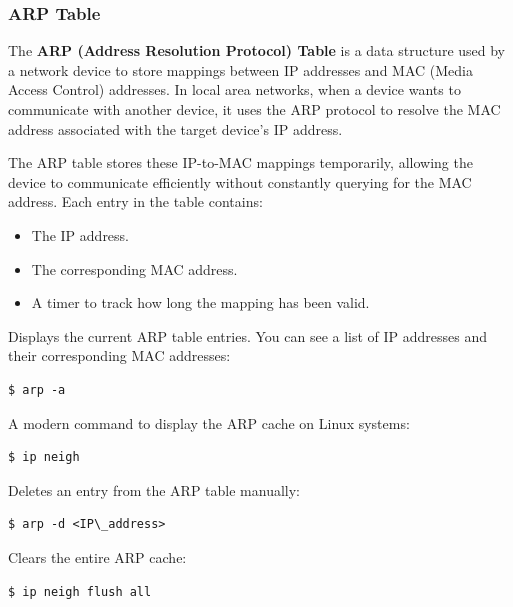 \documentclass{article}
\newenvironment{codetemplate}[1][]{%
  \mybasecolorbox[#1]
  \itshape
}{%
  \endmybasecolorbox
}
\begin{document}
\subsubsection{ARP Table}

The \textbf{ARP (Address Resolution Protocol) Table} is a data structure used by a network device to store mappings between IP addresses and MAC (Media Access Control) addresses. In local area networks, when a device wants to communicate with another device, it uses the ARP protocol to resolve the MAC address associated with the target device's IP address.

The ARP table stores these IP-to-MAC mappings temporarily, allowing the device to communicate efficiently without constantly querying for the MAC address. Each entry in the table contains:
\begin{itemize}
    \item The IP address.
    \item The corresponding MAC address.
    \item A timer to track how long the mapping has been valid.
\end{itemize}

Displays the current ARP table entries. You can see a list of IP addresses and their corresponding MAC addresses:
\begin{codetemplate}{}
\begin{verbatim}
$ arp -a
\end{verbatim}
\end{codetemplate}

A modern command to display the ARP cache on Linux systems:
\begin{codetemplate}{}
\begin{verbatim}
$ ip neigh
\end{verbatim}
\end{codetemplate}

Deletes an entry from the ARP table manually:
\begin{codetemplate}{}
\begin{verbatim}
$ arp -d <IP\_address>
\end{verbatim}
\end{codetemplate}

Clears the entire ARP cache:
\begin{codetemplate}{}
\begin{verbatim}
$ ip neigh flush all
\end{verbatim}
\end{codetemplate}
\end{document}
